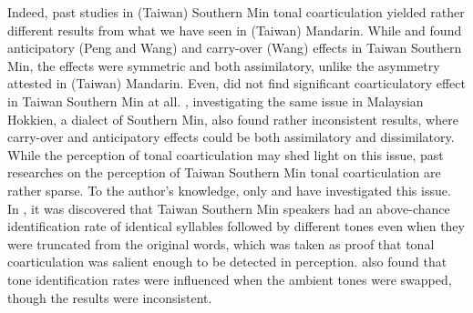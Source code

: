 \documentclass[12pt]{report}
\begin{document}
\begin{CJK}{UTF8}{bsmi}
Indeed, past studies in (Taiwan) Southern Min tonal coarticulation yielded rather different results from what we have seen in (Taiwan) Mandarin. While \cite{Peng1997} and \cite{Wang2002} found anticipatory (Peng and Wang) and carry-over (Wang) effects in Taiwan Southern Min, the effects were symmetric and both assimilatory, unlike the asymmetry attested in (Taiwan) Mandarin. Even, \cite{Lin1988} did not find significant coarticulatory effect in Taiwan Southern Min at all. \cite{ChangHsieh2012}, investigating the same issue in Malaysian Hokkien, a dialect of Southern Min, also found rather inconsistent results, where carry-over and anticipatory effects could be both assimilatory and dissimilatory. While the perception of tonal coarticulation may shed light on this issue, past researches on the perception of Taiwan Southern Min tonal coarticulation are rather sparse. To the author's knowledge, only \cite{Peng1997} and \cite{Wang2002} have investigated this issue. In \cite{Peng1997}, it was discovered that Taiwan Southern Min speakers had an above-chance identification rate of identical syllables followed by different tones even when they were truncated from the original words, which was taken as proof that tonal coarticulation was salient enough to be detected in perception. \cite{Wang2002} also found that tone identification rates were influenced when the ambient tones were swapped, though the results were inconsistent.


\end{CJK}
\end{document}
